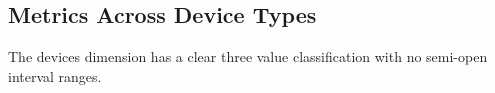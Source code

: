 %
%
%
%


\subsection{Metrics Across Device Types}\label{sec:metdev}

The devices dimension has a clear three value classification with no semi-open interval ranges.

